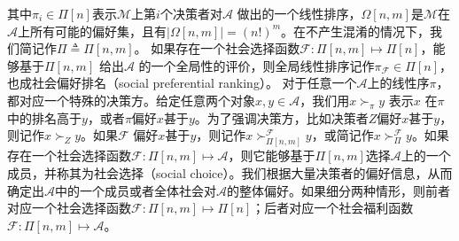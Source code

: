 其中$\pi_i\in \Pi[n]$表示$\mathcal M$上第$i$个决策者对$\mathcal A$ 做出的一个线性排序，$\Omega[n,m]$是$\mathcal M$在$\mathcal A$上所有可能的偏好集，且有$|\Omega[n,m]|=(n!)^m$。在不产生混淆的情况下，我们简记作$\Pi\triangleq \Pi[n,m]$。 如果存在一个社会选择函数$\mathcal F: \Pi[n,m]\mapsto \Pi[n]$，能够基于$\Pi[n,m]$ 给出$\mathcal A$ 的一个全局性的评价，则全局线性排序记作$\pi_{\mathcal F}\in \Pi[n]$，也成社会偏好排名（social preferential ranking）。 对于任意一个$\mathcal A$上的线性序$\pi$，都对应一个特殊的决策方。给定任意两个对象$x,y\in \mathcal A$，我们用$x\succ_\pi y$ 表示$x$ 在$\pi$中的排名高于$y$，或者$\pi$偏好$x$甚于$y$。为了强调决策方，比如决策者$Z$偏好$x$甚于$y$，则记作$x\succ_Z y$。如果$\mathcal F$ 偏好$x$甚于$y$，则记作$x\succ_{\Pi[n,m]}^{\mathcal F} y$，或简记作$x\succ_\Pi^{\mathcal F} y$。如果存在一个社会选择函数$\mathcal F:\Pi[n,m]\mapsto \mathcal A$，则它能够基于$\Pi[n,m]$选择$\mathcal A$上的一个成员，并称其为社会选择（social choice）。我们根据大量决策者的偏好信息，从而确定出$\mathcal A$中的一个成员或者全体社会对$\mathcal A$的整体偏好。如果细分两种情形，则前者对应一个社会选择函数$\mathcal F: \Pi[n,m]\mapsto \Pi[n]$；后者对应一个社会福利函数$\mathcal F: \Pi[n,m]\mapsto \mathcal A$。
